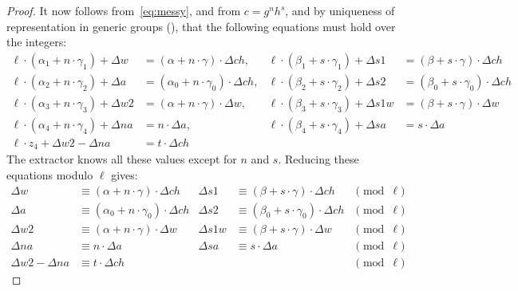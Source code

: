 \documentclass[11pt]{article}
\begin{document}
\begin{proof}
It now follows from~\eqref{eq:messy}, and from $c = g^n h^s$, 
and by uniqueness of representation in generic groups (),
that the following equations must hold over the integers:
\begin{align*}
  \ell \cdot (\alpha_1 + n \cdot \gamma_1) + \Delta w & = (\alpha + n \cdot \gamma) \cdot \Delta \mathit{ch},  &
  \ell \cdot (\beta_1 + s \cdot \gamma_1) + \Delta \mathit{s1} & = (\beta + s \cdot \gamma) \cdot \Delta \mathit{ch}  
\\
  \ell \cdot (\alpha_2 + n \cdot \gamma_2) + \Delta a & = (\alpha_0 + n \cdot \gamma_0) \cdot \Delta \mathit{ch},  &
  \ell \cdot (\beta_2 + s \cdot \gamma_2) + \Delta \mathit{s2} & = (\beta_0 + s \cdot \gamma_0) \cdot \Delta \mathit{ch}  
\\
  \ell \cdot (\alpha_3 + n \cdot \gamma_3) + \Delta \mathit{w2} & = (\alpha + n \cdot \gamma) \cdot \Delta w,  &
  \ell \cdot (\beta_3 + s \cdot \gamma_3) + \Delta \mathit{s1w} & = (\beta + s \cdot \gamma) \cdot \Delta w   
\\
  \ell \cdot (\alpha_4 + n \cdot \gamma_4) + \Delta \mathit{na} & = n \cdot \Delta a,  & 
  \ell \cdot (\beta_4 + s \cdot \gamma_4) + \Delta \mathit{sa} & = s \cdot \Delta a   
\\
  \ell \cdot z_4 + \Delta \mathit{w2} - \Delta \mathit{na} & = t \cdot \Delta \mathit{ch} 
\end{align*}
The extractor knows all these values except for $n$ and $s$.
Reducing these equations modulo $\ell$ gives:
\begin{align}
  \Delta w & \equiv (\alpha + n \cdot \gamma) \cdot \Delta \mathit{ch}  &
  \Delta \mathit{s1} & \equiv (\beta + s \cdot \gamma) \cdot \Delta \mathit{ch}  & \pmod{\ell} 
\label{eq:first} \\
  \Delta a & \equiv (\alpha_0 + n \cdot \gamma_0) \cdot \Delta \mathit{ch}  &
  \Delta \mathit{s2} & \equiv (\beta_0 + s \cdot \gamma_0) \cdot \Delta \mathit{ch}  & \pmod{\ell} 
\label{eq:firsta} \\
  \Delta \mathit{w2} & \equiv (\alpha + n \cdot \gamma) \cdot \Delta w  &
  \Delta \mathit{s1w} & \equiv (\beta + s \cdot \gamma) \cdot \Delta w   & \pmod{\ell} 
\label{eq:second} \\
  \Delta \mathit{na} & \equiv n \cdot \Delta a  & 
  \Delta \mathit{sa} & \equiv s \cdot \Delta a   & \pmod{\ell} 
\label{eq:third} \\
  \Delta \mathit{w2} - \Delta \mathit{na} & \equiv t \cdot \Delta \mathit{ch} 
      &&& \pmod{\ell} 
\label{eq:fourth} 
\end{align}


\end{proof}
\end{document}
